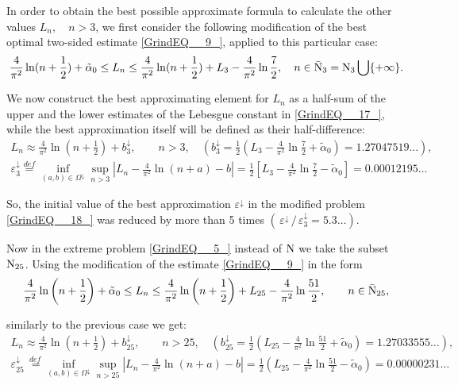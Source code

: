 \documentclass[
11pt,%
tightenlines,%
twoside,%
onecolumn,%
nofloats,%
nobibnotes,%
nofootinbib,%
superscriptaddress,%
noshowpacs,%
centertags]%
{revtex4}
\begin{document}
In order to obtain the best possible approximate formula to calculate the other values $L_{n},\quad n>3$, we first consider the following modification of the best optimal two-sided estimate \eqref{GrindEQ__9_}, applied to this particular case:
\begin{equation}\label{GrindEQ__17_}
\frac{4}{\pi ^{2} } \ln (n+\frac{1}{2} ) + \tilde{\alpha }_{0}  \le  L_{n}  \le  \frac{4}{\pi ^{2} } \ln (n+ \frac{1}{2} ) + L_{3}  - \frac{4}{\pi ^{2} } \ln \frac{7}{2},\quad n\in \bar{{\rm N} }_{3} = {\rm N} _{3} \bigcup \{ +\infty \}.
\end{equation}

We now construct the best approximating element for $L_{n} $ as a half-sum of the upper and the lower estimates of the Lebesgue constant in \eqref{GrindEQ__17_}, while the best approximation itself will be defined as their half-difference:
\begin{multline}\label{GrindEQ__18_}
L_{n}  \approx  \frac{4}{\pi ^{2} } \ln (n + \frac{1}{2} ) + b_{3}^{\downarrow },\qquad  n>3,\quad \left(b_{3}^{\downarrow } = \frac{1}{2}  \left(L_{3} - \frac{4}{\pi ^{2} } \ln \frac{7}{2}  + \tilde{\alpha }_{0} \right) = 1.27047519\dots\right),\\
\varepsilon _{3}^{\downarrow } \mathop{=}\limits^{def}  \mathop{\inf }\limits_{(a, b)\in \Omega ^{\downarrow } } \mathop{\sup }\limits_{n > 3} \left|L_{n} - \frac{4}{\pi ^{2} } \ln (n+a) - b\right| =
\frac{1}{2} \left[L_{3}  - \frac{4}{\pi ^{2} } \ln \frac{7}{2}  - \tilde{\alpha }_{0} \right] =0.00012195\dots
\end{multline}

So, the initial value of the best approximation $\varepsilon ^{\downarrow } $ in the modified problem  \eqref{GrindEQ__18_} was reduced by more than 5 times  $(\, \varepsilon ^{\downarrow }\, /\, \varepsilon _{3}^{\downarrow }  = 5.3\dots)$.

Now in the extreme problem \eqref{GrindEQ__5_} instead of ${\rm N} $ we take the subset ${\rm N} _{25}$. Using the modification of the estimate \eqref{GrindEQ__9_} in the form
\begin{equation*}
\frac{4}{\pi ^{2} } \ln \left(n+ \frac{1}{2} \right) + \tilde{\alpha }_{0}  \le  L_{n}  \le  \frac{4}{\pi ^{2} } \ln \left(n+ \frac{1}{2} \right) + L_{25} - \frac{4}{\pi ^{2} } \ln \frac{51}{2}, \qquad n\in \bar{{\rm N} }_{25},
\end{equation*}

similarly to the previous case we get:
\begin{multline}\label{GrindEQ__19_}
L_{n}  \approx  \frac{4}{\pi ^{2} } \ln \left(n + \frac{1}{2} \right) + b_{25}^{\downarrow },\qquad  n>25, \quad \left(
b_{25}^{\downarrow }  = \frac{1}{2}  \left(L_{25}  - \frac{4}{\pi ^{2} } \ln \frac{51}{2}  + \tilde{\alpha }_{0} \right) =1.27033555\dots\right), \\
\varepsilon _{25}^{\downarrow } \, \mathop{\, =}\limits^{def} \mathop{\inf }\limits_{(a,b)\in \Omega ^{\downarrow }} \mathop{\sup }\limits_{n >25} \left|L_{n} -\frac{4}{\pi ^{2} }  \ln (n+a) -b\right| =
\frac{1}{2} \left(L_{25}  - \frac{4}{\pi ^{2} } \ln \frac{51}{2}  - \tilde{\alpha }_{0} \right) = 0.00000231\dots
\end{multline}
\end{document}
